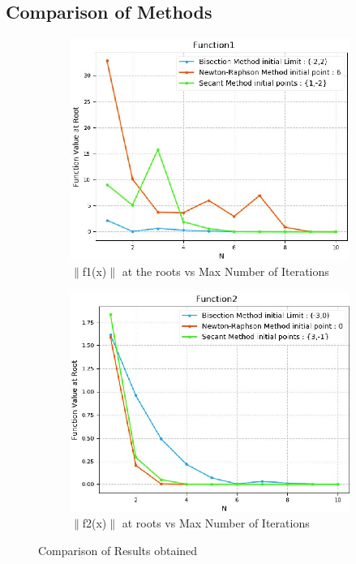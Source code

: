 \documentclass[11pt]{article}
\begin{document}
\subsection{Comparison of Methods}
\begin{figure} [h!]
	\centering
	\begin{subfigure}{0.55\textwidth}
		\centering
		\includegraphics[width=\linewidth]{all-f1-abs}
		\caption{$\|$f1(x)$\|$ at the roots vs Max Number of Iterations}
		\label{fig4:sub1}
	\end{subfigure}%
	\begin{subfigure}{0.55\textwidth}
		\centering
		\includegraphics[width=\linewidth]{all-f2-abs}
		\caption{$\|$f2(x)$\|$ at roots vs Max Number of Iterations}
		\label{fig4:sub2}
	\end{subfigure}
	\caption{Comparison of Results obtained}
\end{figure}
\pagebreak
\end{document}
